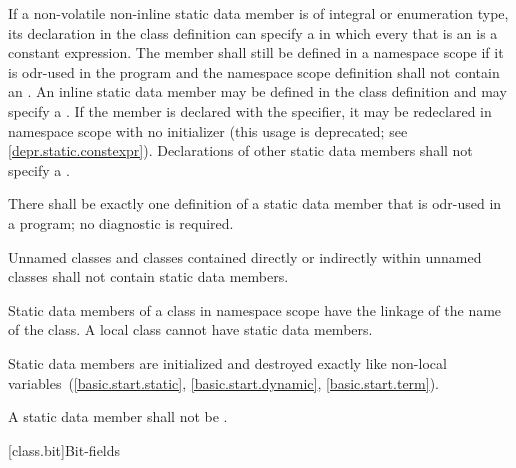 \pnum
If a non-volatile non-inline  static data member is
of integral or enumeration type,
its declaration in the class definition can specify a
 in which every
 that is an 
is a constant expression.
The member shall still be defined in a namespace scope if
it is odr-used in the program and the
namespace scope definition shall not contain an .
An inline static data member may be defined in the class definition
and may specify a . If the
member is declared with the  specifier, it may be
redeclared in namespace scope with no initializer (this usage is
deprecated; see \ref{depr.static.constexpr}). Declarations of other
static data members shall not specify a .

\pnum
\begin{note}
There shall be exactly one definition of a static data member
that is odr-used in a program; no diagnostic is required.
\end{note}
Unnamed classes and classes contained directly
or indirectly within unnamed classes shall not contain static
data members.

\pnum
\begin{note}
Static data members of a class in namespace scope have the linkage of the name of the class.
A local class cannot have static data members.
\end{note}

\pnum
Static data members are initialized and destroyed exactly like
non-local variables~(\ref{basic.start.static}, \ref{basic.start.dynamic},
\ref{basic.start.term}).

\pnum
A static data member shall not be
.

[class.bit]{Bit-fields}%

